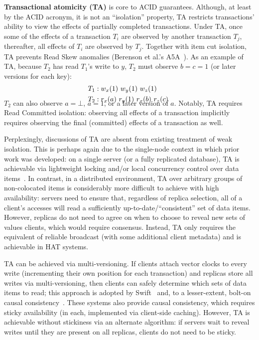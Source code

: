 \textbf{Transactional atomicity (TA)} is core to ACID guarantees. Although, at
least by the ACID acronym, it is not an ``isolation'' property, TA
restricts transactions' ability to view the effects of partially
completed transactions. Under TA, once some of the effects of a
transaction $T_i$ are observed by another transaction $T_j$,
thereafter, all effects of $T_i$ are observed by $T_j$. Together with
item cut isolation, TA prevents Read Skew anomalies (Berenson et al.'s
A5A~\cite{ansicritique}). As an example of TA, because $T_2$ has read
$T_1$'s write to $y$, $T_2$ must observe $b=c=1$ (or later versions
for each key):
\vspace{-1em}
\begin{align*}
\small
T_1 &: w_x(1)~w_y(1)~w_z(1)
\\T_2 &: r_x(a)~r_y(1)~r_x(b)~r_z(c)~\\[-1.5em]
\end{align*}
$T_2$ can also observe $a=\bot$, $a=1$, or a later version of
$a$. Notably, TA requires Read Committed isolation: observing all
effects of a transaction implicitly requires observing the final
(committed) effects of a transaction as well.

Perplexingly, discussions of TA are absent from existing treatment of
weak isolation. This is perhaps again due to the single-node context
in which prior work was developed: on a single server (or a fully
replicated database), TA is achievable via lightweight locking and/or
local concurrency control over data items~\cite{gstore}. In contrast,
in a distributed environment, TA over arbitrary groups of
non-colocated items is considerably more difficult to achieve with
high availability: servers need to ensure that, regardless of replica
selection, all of a client's accesses will read a sufficiently
up-to-date/``consistent'' set of data items. However, replicas do not
need to agree on when to choose to reveal new sets of values clients,
which would require consensus. Instead, TA only requires the
equivalent of reliable broadcast (with some additional client
metadata) and is achievable in HAT systems.

TA can be achieved via multi-versioning. If clients attach vector
clocks to every write (incrementing their own position for each
transaction) and replicas store all writes via multi-versioning, then
clients can safely determine which sets of data items to read; this
approach is adopted by Swift~\cite{swift} and, to a lesser-extent,
bolt-on causal consistency~\cite{bolton}. These systems also provide
causal consistency, which requires sticky availability (in each,
implemented via client-side caching). However, TA is achievable
without stickiness via an alternate algorithm: if servers wait to
reveal writes until they are present on all replicas, clients do not
need to be sticky.

